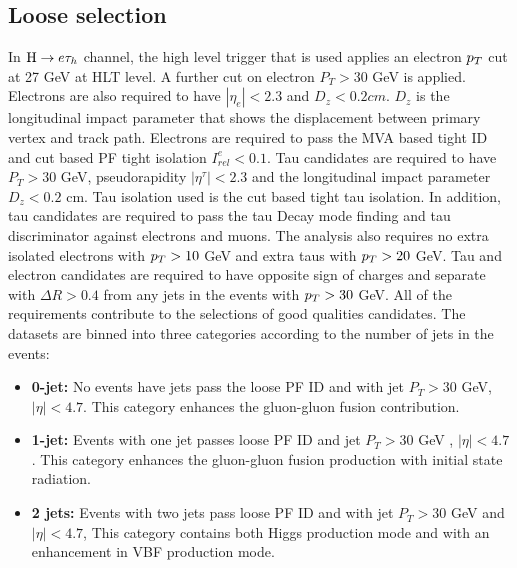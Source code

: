 \subsection{Loose selection}
In $ \mathrm{H} \to e \tau_{h}$ channel, the high level trigger that is used applies an electron $p_{T}$ cut at 27 GeV at HLT level. A further cut on electron $P_{T}>30$ GeV is applied. Electrons are also required to have $|\eta_{e}|<2.3$ and $D_{z}<0.2 cm$. $D_{z}$ is the longitudinal impact parameter that shows the displacement between primary vertex and track path. Electrons are required to pass the MVA based tight ID and cut based PF tight isolation  $I_{rel}^{e}<0.1$. Tau candidates are required to have $P_{T}>30$ GeV, pseudorapidity $|\eta^{\tau}|<2.3$ and the longitudinal impact parameter $D_{z}<0.2$ cm. Tau isolation used is the cut based tight tau isolation. In addition, tau candidates are required to pass the tau Decay mode finding and tau discriminator against electrons and muons. The analysis also requires no extra isolated electrons with $p_{T}>10$ GeV and extra taus with $p_{T}>20$ GeV. Tau and electron candidates are required to have opposite sign of charges and separate with $\Delta R>0.4$ from any jets in the events with $p_{T}>30$ GeV. All of the requirements contribute to the selections of good qualities candidates. The datasets are binned into three categories according to the number of jets in the events:
\begin{itemize}
\item  \textbf{0-jet:} No events have jets pass the loose PF ID and  with jet $P_T>30$ GeV, $|\eta|<4.7$. This category enhances the gluon-gluon fusion contribution.
\item  \textbf{1-jet:} Events with one jet passes loose PF ID and jet $P_T>30$ GeV , $|\eta|<4.7$. This category enhances the gluon-gluon fusion production with initial state radiation.
\item \textbf{2 jets:} Events with two jets pass loose PF ID and with jet $P_T>30$ GeV and $|\eta|<4.7$, This category contains both Higgs production mode and with an enhancement in VBF production mode. 
\end{itemize}

